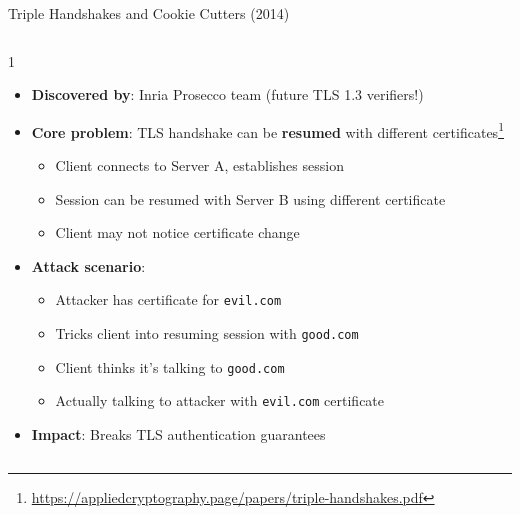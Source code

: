 \documentclass[aspectratio=169, lualatex, handout]{beamer}
\begin{document}
\begin{frame}{Triple Handshakes and Cookie Cutters (2014)}
	\begin{columns}[c]
		\begin{column}{1\textwidth}
			\begin{itemize}[<+->]
				\item \textbf{Discovered by}: Inria Prosecco team (future TLS 1.3 verifiers!)
				\item \textbf{Core problem}: TLS handshake can be \textbf{resumed} with different certificates\footnote{\url{https://appliedcryptography.page/papers/triple-handshakes.pdf}}
				      \begin{itemize}
					      \item Client connects to Server A, establishes session
					      \item Session can be resumed with Server B using different certificate
					      \item Client may not notice certificate change
				      \end{itemize}
				\item \textbf{Attack scenario}:
				      \begin{itemize}
					      \item Attacker has certificate for \texttt{evil.com}
					      \item Tricks client into resuming session with \texttt{good.com}
					      \item Client thinks it's talking to \texttt{good.com}
					      \item Actually talking to attacker with \texttt{evil.com} certificate
				      \end{itemize}
				\item \textbf{Impact}: Breaks TLS authentication guarantees
			\end{itemize}
		\end{column}
	\end{columns}
\end{frame}
\end{document}
